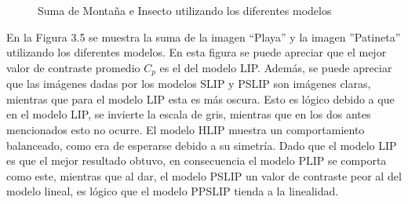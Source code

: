 \begin{figure}
\begin{center}
		\caption{Suma de Monta\~na e Insecto utilizando los diferentes modelos}
	\end{center}
\end{figure}

En la Figura 3.5 se muestra la suma de la imagen ``Playa'' y la imagen ''Patineta'' utilizando los diferentes modelos. En esta figura se puede apreciar que el mejor valor de contraste promedio $C_p$ es el del modelo LIP. Adem\'as, se puede apreciar que las im\'agenes dadas por los modelos SLIP y PSLIP son im\'agenes claras, mientras que para el modelo LIP esta es m\'as oscura. Esto es l\'ogico debido a que en el modelo LIP, se invierte la escala de gris, mientras que en los dos antes mencionados esto no ocurre. El modelo HLIP muestra un comportamiento balanceado, como era de esperarse debido a su simetr\'ia. Dado que el modelo LIP es que el mejor resultado obtuvo, en consecuencia el modelo PLIP se comporta como este, mientras que al dar, el modelo PSLIP un valor de contraste peor al del modelo lineal, es l\'ogico que el modelo PPSLIP tienda a la linealidad.

